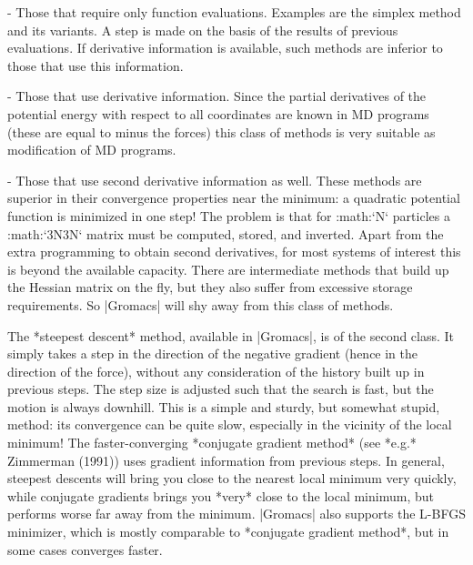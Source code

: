 -  Those that require only function evaluations. Examples are the
   simplex method and its variants. A step is made on the basis of the
   results of previous evaluations. If derivative information is
   available, such methods are inferior to those that use this
   information.

-  Those that use derivative information. Since the partial derivatives
   of the potential energy with respect to all coordinates are known in
   MD programs (these are equal to minus the forces) this class of
   methods is very suitable as modification of MD programs.

-  Those that use second derivative information as well. These methods
   are superior in their convergence properties near the minimum: a
   quadratic potential function is minimized in one step! The problem is
   that for :math:`N` particles a :math:`3N\times 3N` matrix must be
   computed, stored, and inverted. Apart from the extra programming to
   obtain second derivatives, for most systems of interest this is
   beyond the available capacity. There are intermediate methods that
   build up the Hessian matrix on the fly, but they also suffer from
   excessive storage requirements. So |Gromacs| will shy away from this
   class of methods.

The *steepest descent* method, available in |Gromacs|, is of the second
class. It simply takes a step in the direction of the negative gradient
(hence in the direction of the force), without any consideration of the
history built up in previous steps. The step size is adjusted such that
the search is fast, but the motion is always downhill. This is a simple
and sturdy, but somewhat stupid, method: its convergence can be quite
slow, especially in the vicinity of the local minimum! The
faster-converging *conjugate gradient method* (see *e.g.* Zimmerman
(1991)) uses gradient information from previous steps. In general,
steepest descents will bring you close to the nearest local minimum very
quickly, while conjugate gradients brings you *very* close to the local
minimum, but performs worse far away from the minimum. |Gromacs| also
supports the L-BFGS minimizer, which is mostly comparable to *conjugate
gradient method*, but in some cases converges faster.


